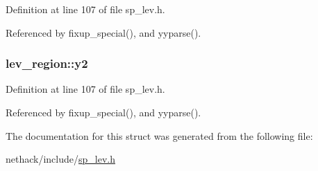 Definition at line 107 of file sp\+\_\+lev.\+h.



Referenced by fixup\+\_\+special(), and yyparse().

\hypertarget{structlev__region_a6a7635569e2568f1c75e97ff9db7f655}{
\subsubsection[{y2}]{ lev\+\_\+region\+::y2}}\label{structlev__region_a6a7635569e2568f1c75e97ff9db7f655}


Definition at line 107 of file sp\+\_\+lev.\+h.



Referenced by fixup\+\_\+special(), and yyparse().



The documentation for this struct was generated from the following file\+:\begin{DoxyCompactItemize}
\item 
nethack/include/\hyperlink{sp__lev_8h}{sp\+\_\+lev.\+h}\end{DoxyCompactItemize}
